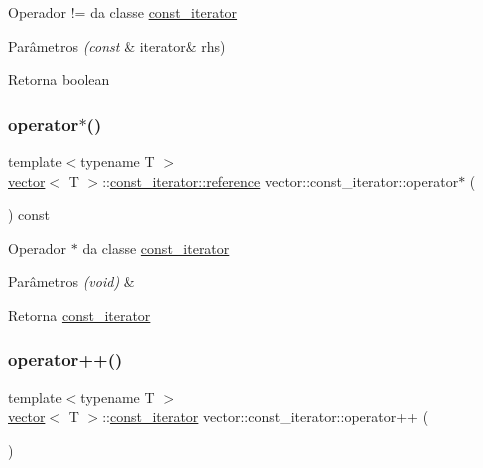 Operador != da classe \mbox{\hyperlink{classsc_1_1vector_1_1const__iterator}{const\+\_\+iterator}} 
\begin{DoxyParams}{Parâmetros}
{\em (const} & iterator\& rhs) \\
\hline
\end{DoxyParams}
\begin{DoxyReturn}{Retorna}
boolean 
\end{DoxyReturn}
\mbox{\label{classsc_1_1vector_1_1const__iterator_acfa1d4962b2324b5cf0a7eddfbd45450}} 
\subsubsection{\texorpdfstring{operator$\ast$()}{operator*()}}
{\footnotesize\ttfamily template$<$typename T $>$ \\
\mbox{\hyperlink{classsc_1_1vector}{vector}}$<$ T $>$\+::\mbox{\hyperlink{classsc_1_1vector_1_1const__iterator_a750fedbe98f230fe9bf520117730485b}{const\+\_\+iterator\+::reference}} vector\+::const\+\_\+iterator\+::operator$\ast$ (\begin{DoxyParamCaption}\item[{void}]{ }\end{DoxyParamCaption}) const}

Operador $\ast$ da classe \mbox{\hyperlink{classsc_1_1vector_1_1const__iterator}{const\+\_\+iterator}} 
\begin{DoxyParams}{Parâmetros}
{\em (void)} & \\
\hline
\end{DoxyParams}
\begin{DoxyReturn}{Retorna}
\mbox{\hyperlink{classsc_1_1vector_1_1const__iterator}{const\+\_\+iterator}} 
\end{DoxyReturn}
\mbox{\label{classsc_1_1vector_1_1const__iterator_a3cc519aa78c728251dc157b641bda883}} 
\subsubsection{\texorpdfstring{operator++()}{operator++()}\hspace{0.1cm}{\footnotesize\ttfamily [1/2]}}
{\footnotesize\ttfamily template$<$typename T $>$ \\
\mbox{\hyperlink{classsc_1_1vector}{vector}}$<$ T $>$\+::\mbox{\hyperlink{classsc_1_1vector_1_1const__iterator}{const\+\_\+iterator}} vector\+::const\+\_\+iterator\+::operator++ (\begin{DoxyParamCaption}{ }\end{DoxyParamCaption})}

